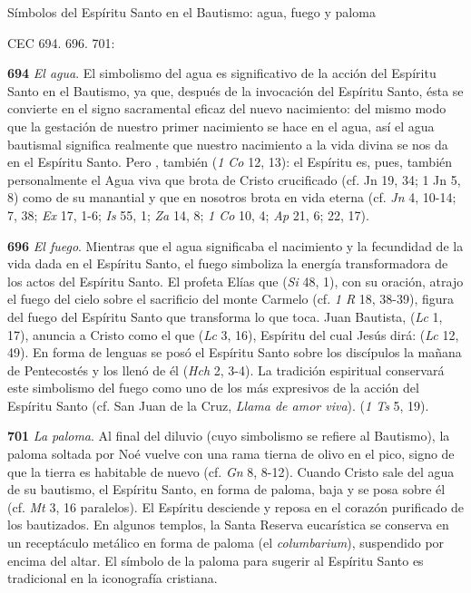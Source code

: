 \begin{body}
\begin{body}
{Símbolos del Espíritu Santo en el Bautismo: agua, fuego y paloma

CEC 694. 696. 701:

\textbf{694} \emph{El agua}. El simbolismo del agua es significativo de la acción del Espíritu Santo en el Bautismo, ya que, después de la invocación del Espíritu Santo, ésta se convierte en el signo sacramental eficaz del nuevo nacimiento: del mismo modo que la gestación de nuestro primer nacimiento se hace en el agua, así el agua bautismal significa realmente que nuestro nacimiento a la vida divina se nos da en el Espíritu Santo. Pero , también  (\emph{1 Co} 12, 13): el Espíritu es, pues, también personalmente el Agua viva que brota de Cristo crucificado (cf. Jn 19, 34; 1 Jn 5, 8) como de su manantial y que en nosotros brota en vida eterna (cf. \emph{Jn} 4, 10-14; 7, 38; \emph{Ex} 17, 1-6; \emph{Is} 55, 1; \emph{Za} 14, 8; \emph{1 Co} 10, 4; \emph{Ap} 21, 6; 22, 17).

\textbf{696} \emph{El fuego}. Mientras que el agua significaba el nacimiento y la fecundidad de la vida dada en el Espíritu Santo, el fuego simboliza la energía transformadora de los actos del Espíritu Santo. El profeta Elías que  (\emph{Si} 48, 1), con su oración, atrajo el fuego del cielo sobre el sacrificio del monte Carmelo (cf. \emph{1 R} 18, 38-39), figura del fuego del Espíritu Santo que transforma lo que toca. Juan Bautista,  (\emph{Lc} 1, 17), anuncia a Cristo como el que  (\emph{Lc} 3, 16), Espíritu del cual Jesús dirá:  (\emph{Lc} 12, 49). En forma de lenguas  se posó el Espíritu Santo sobre los discípulos la mañana de Pentecostés y los llenó de él (\emph{Hch} 2, 3-4). La tradición espiritual conservará este simbolismo del fuego como uno de los más expresivos de la acción del Espíritu Santo (cf. San Juan de la Cruz, \emph{Llama de amor viva}).  (\emph{1 Ts} 5, 19).

\textbf{701} \emph{La paloma}. Al final del diluvio (cuyo simbolismo se refiere al Bautismo), la paloma soltada por Noé vuelve con una rama tierna de olivo en el pico, signo de que la tierra es habitable de nuevo (cf. \emph{Gn} 8, 8-12). Cuando Cristo sale del agua de su bautismo, el Espíritu Santo, en forma de paloma, baja y se posa sobre él (cf. \emph{Mt} 3, 16 paralelos). El Espíritu desciende y reposa en el corazón purificado de los bautizados. En algunos templos, la Santa Reserva eucarística se conserva en un receptáculo metálico en forma de paloma (el \emph{columbarium}), suspendido por encima del altar. El símbolo de la paloma para sugerir al Espíritu Santo es tradicional en la iconografía cristiana.

}
\end{body}
\end{body}
